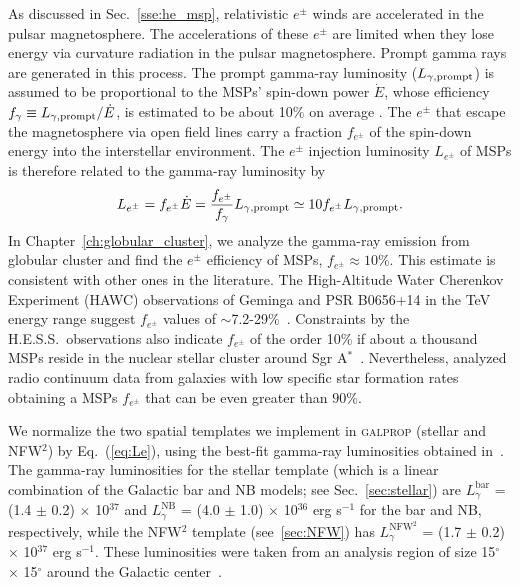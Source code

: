 \documentclass[doublespace,nopageskip]{VTthesis}
\begin{document}
As discussed in Sec.~\ref{sse:he_msp}, relativistic $e^\pm$ winds are accelerated in the pulsar magnetosphere. The accelerations of these $e^\pm$ are limited when they lose energy via curvature radiation in the pulsar magnetosphere. Prompt gamma rays are generated in this process. The prompt gamma-ray luminosity ($L_{\gamma,{\rm prompt}}$) is assumed to be proportional to the MSPs' spin-down power $\dot{E}$, whose efficiency $f_\gamma \equiv L_{\gamma,{\rm prompt}}/\dot{E}$, is estimated to be about 10\% on average \citep{2013ApJS..208...17A}. The $e^\pm$ that escape the magnetosphere via open field lines carry a fraction $f_{e^\pm}$ of the spin-down energy into the interstellar environment. The $e^\pm$ injection luminosity $L_{e^\pm}$ of MSPs is therefore related to the gamma-ray luminosity by
\begin{equation}\label{eq:Le}
  L_{e^\pm}=f_{e^\pm}\dot{E}=\frac{f_{e^\pm}}{f_{\gamma}}  L_{\gamma,{\rm prompt}} \simeq 10f_{e^\pm} L_{\gamma,{\rm prompt}}.
\end{equation}
In Chapter~\ref{ch:globular_cluster}, we analyze the gamma-ray emission from globular cluster and find the $e^\pm$ efficiency of MSPs, $f_{e^\pm}\approx 10\%$. This estimate is consistent with other ones in the literature. The High-Altitude Water Cherenkov Experiment (HAWC) observations of Geminga and PSR B0656+14 in the TeV energy range suggest $f_{e^\pm}$ values of $\sim$7.2-29\%~\cite{2017PhRvD..96j3013H}. Constraints by the H.E.S.S.~observations also indicate $f_{e^\pm}$ of the order 10\% if about a thousand MSPs reside in the nuclear stellar cluster around Sgr A$^*$~\cite{2013MNRAS.435L..14B}. Nevertheless, \citet{2021PhRvD.103h3017S} analyzed radio continuum data from galaxies with low specific star formation rates obtaining a MSPs $f_{e^\pm}$ that can be even greater than $90\%$.

We normalize the two spatial templates we implement in \textsc{galprop} (stellar and NFW$^2$) by Eq.~(\ref{eq:Le}), using the best-fit gamma-ray luminosities obtained in~\citet{2018NatAs...2..387M}. The gamma-ray luminosities for the stellar template (which is a linear combination of the Galactic bar and NB models; see Sec.~\ref{sec:stellar}) are $L^{\text{bar}}_\gamma$ = (1.4 $\pm$ 0.2) $\times$ 10$^{37}$ and $L^{\text{NB}}_\gamma$ = (4.0 $\pm$ 1.0) $\times$ 10$^{36}$ erg s$^{-1}$ for the bar and NB, respectively, while the NFW$^2$ template (see~\ref{sec:NFW}) has $L^{\text{NFW}^2}_\gamma$ = (1.7 $\pm$ 0.2) $\times$ 10$^{37}$ erg s$^{-1}$. These luminosities were taken from an analysis region of size 15$^\circ$ $\times$ 15$^\circ$ around the Galactic center~\cite{2018NatAs...2..387M}.
\end{document}
